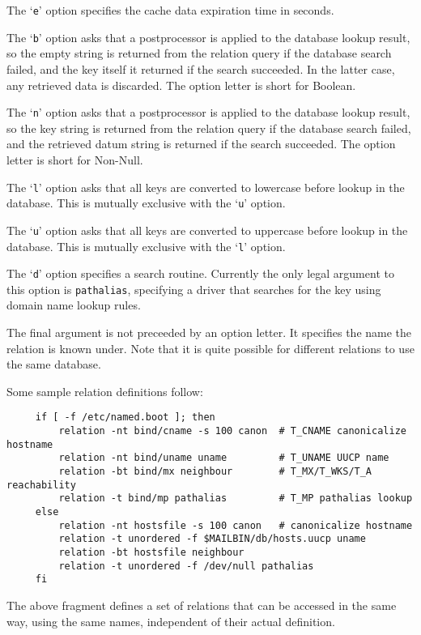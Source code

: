The `{\tt e}' option specifies the cache data expiration time in seconds.

The `{\tt b}' option asks that a postprocessor is applied to the database 
lookup result, so the empty string is returned from the relation query if the
database search failed, and the key itself it returned if the search
succeeded.  In the latter case, any retrieved data is discarded.  The
option letter is short for Boolean.

The `{\tt n}' option asks that a postprocessor is applied to the database 
lookup result, so the key string is returned from the relation query if the
database search failed, and the retrieved datum string is returned if the
search succeeded.  The option letter is short for Non-Null.

The `{\tt l}' option asks that all keys are converted to lowercase before 
lookup in the database.  This is mutually exclusive with the `{\tt u}' 
option.

The `{\tt u}' option asks that all keys are converted to uppercase before 
lookup in the database.  This is mutually exclusive with the `{\tt l}' 
option.

The `{\tt d}' option specifies a search routine.  Currently the only legal
argument to this option is {\tt pathalias}, specifying a driver that searches
for the key using domain name lookup rules.

The final argument is not preceeded by an option letter.  It specifies the
name the relation is known under.  Note that it is quite possible for
different relations to use the same database.

Some sample relation definitions follow:

\begin{verbatim}
     if [ -f /etc/named.boot ]; then
         relation -nt bind/cname -s 100 canon  # T_CNAME canonicalize hostname
         relation -nt bind/uname uname         # T_UNAME UUCP name
         relation -bt bind/mx neighbour        # T_MX/T_WKS/T_A reachability
         relation -t bind/mp pathalias         # T_MP pathalias lookup
     else
         relation -nt hostsfile -s 100 canon   # canonicalize hostname
         relation -t unordered -f $MAILBIN/db/hosts.uucp uname
         relation -bt hostsfile neighbour
         relation -t unordered -f /dev/null pathalias
     fi
\end{verbatim}


The above fragment defines a set of relations that can be accessed in the
same way, using the same names, independent of their actual definition.

